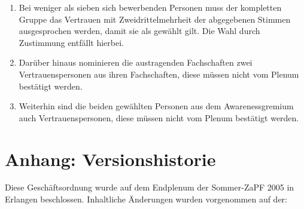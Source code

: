 \documentclass[
  ngerman,
  a4paper,
  oneside]{scrartcl}
\begin{document}
\begin{enumerate}
  eines Geschlechts und/oder ohne Migrationsgeschichte beworben haben,
  ist diese Regelung irrelevant.
\item
  Bei weniger als sieben sich bewerbenden Personen muss der kompletten
  Gruppe das Vertrauen mit Zweidrittelmehrheit der abgegebenen Stimmen
  ausgesprochen werden, damit sie als gewählt gilt. Die Wahl durch
  Zustimmung entfällt hierbei.
\item
  Darüber hinaus nominieren die austragenden Fachschaften zwei
  Vertrauenspersonen aus ihren Fachschaften, diese müssen nicht vom
  Plenum bestätigt werden.
\item
  Weiterhin sind die beiden gewählten Personen aus dem Awarenessgremium
  auch Vertrauenspersonen, diese müssen nicht vom Plenum bestätigt
  werden.
\end{enumerate}

\section*{Anhang: Versionshistorie}\label{anhang-versionshistorie}

Diese Geschäftsordnung wurde auf dem Endplenum der Sommer-ZaPF 2005 in
Erlangen beschlossen. Inhaltliche Änderungen wurden vorgenommen auf der:
\end{document}
